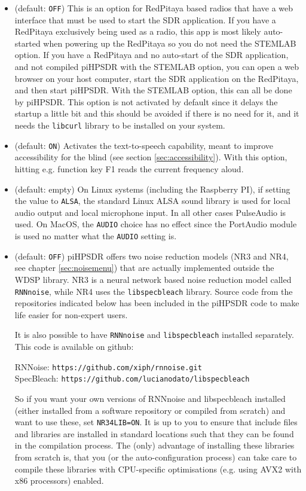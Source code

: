 \documentclass[12pt]{book}
\def\rett#1{\texttt{\color{red}#1}}
\def\pH{pi\-HPSDR\xspace}
\begin{document}
\begin{itemize}
\item[\rett{STEMLAB}] {(default: \texttt{OFF})
This is an option for RedPitaya based radios that have a web interface that must be used
to start the SDR application. If you have a RedPitaya exclusively being used as a radio, this
app is most likely auto-started when powering up the RedPitaya so you do not need the STEMLAB
option.
If you have a RedPitaya and no auto-start of the SDR application, and not compiled \pH
with the STEMLAB option, you can open a web browser on your host computer, start the SDR application on the RedPitaya,
and then start \pH. With the STEMLAB option, this can all be done by \pH.
This option is not activated by default since it delays the startup a little bit  and  this should  be
avoided if  there is no need for it, and it needs the \texttt{libcurl}  library to be installed on your system.
}

\item[\rett{TTS}] {(default: \texttt{ON})
Activates the text-to-speech capability, meant to improve accessibility for the blind
(see section \ref{sec:accessibility}). With this option, hitting e.g. function key F1
reads the current frequency aloud.
}

\item[\rett{AUDIO}] {(default: empty)
On Linux systems (including the Raspberry PI), if setting the value to \texttt{ALSA},
the standard Linux ALSA sound library is used for local audio
output and local microphone input. In all other cases
PulseAudio is used. On MacOS, the \texttt{AUDIO} choice has no effect since the PortAudio
module is used no matter what the \texttt{AUDIO} setting is.
}

\item[\rett{NR34LIB}] {(default: \texttt{OFF})
\pH offers two noise reduction models (NR3 and NR4, see chapter \ref{sec:noisemenu})
that are actually implemented outside the WDSP library.
NR3 is a neural network based noise reduction model called \texttt{RNNnoise}, while NR4
uses the \texttt{libspecbleach} library. Source code from the repositories indicated below
has been included in the \pH code to make life easier for non-expert users.

It is also possible to have \texttt{RNNnoise} and \texttt{libspecbleach} installed
separately. This code is available on github:

RNNoise: \texttt{https://github.com/xiph/rnnoise.git} \\
SpecBleach: \texttt{https://github.com/lucianodato/libspecbleach}

So if you want your own versions of RNNnoise and libspecbleach
installed (either installed from a software repository or compiled
from scratch) and want to use these, set \texttt{NR34LIB=ON}. It is up to you
to ensure that include files and libraries are installed in standard locations
such that they can be found in the compilation process.
The (only) advantage of installing these libraries from scratch is, that you
(or the auto-configuration process) can take care to compile these libraries
with CPU-specific optimisations (e.g. using AVX2 with x86 processors) enabled.
}

\end{itemize}
\end{document}
